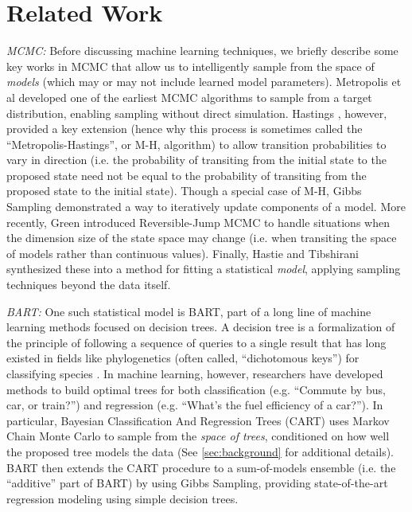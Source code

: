 \documentclass[12pt]{article}
\begin{document}
\section{Related Work}\label{sec:related}

\emph{MCMC:} Before discussing machine learning techniques, we briefly describe some key works in MCMC that allow us to intelligently sample from the space of \emph{models} (which may or may not include learned model parameters).  Metropolis et al \cite{metropolis1953equation} developed one of the earliest MCMC algorithms to sample from a target distribution, enabling sampling without direct simulation.  Hastings \cite{hastings1970monte}, however, provided a key extension (hence why this process is sometimes called the ``Metropolis-Hastings'', or M-H, algorithm) to allow transition probabilities to vary in direction (i.e. the probability of transiting from the initial state to the proposed state need not be equal to the probability of transiting from the proposed state to the initial state).  Though a special case of M-H, Gibbs Sampling \cite{geman1984stochastic} demonstrated a way to iteratively update components of a model.  More recently, Green \cite{green1995reversible} introduced Reversible-Jump MCMC to handle situations when the dimension size of the state space may change (i.e. when transiting the space of models rather than continuous values).  Finally, Hastie and Tibshirani \cite{hastie2000bayesian} synthesized these into a method for fitting a statistical \emph{model}, applying sampling techniques beyond the data itself.

\emph{BART:} One such statistical model is BART, part of a long line of machine learning methods focused on decision trees.   A decision tree is a formalization of the principle of following a sequence of queries to a single result that has long existed in fields like phylogenetics (often called, ``dichotomous keys'') for classifying species \cite{pankhurst1991practical}.  In machine learning, however, researchers have developed methods to build optimal trees for both classification (e.g. ``Commute by bus, car, or train?'') and regression \cite{breiman1984classification} (e.g. ``What's the fuel efficiency of a car?'').  In particular, Bayesian Classification And Regression Trees (CART) \cite{chipman1998bayesian} uses Markov Chain Monte Carlo to sample from the \emph{space of trees}, conditioned on how well the proposed tree models the data (See \autoref{sec:background} for additional details).  BART \cite{chipman2010bart} then extends the CART procedure to a sum-of-models ensemble (i.e. the ``additive'' part of BART) by using Gibbs Sampling, providing state-of-the-art regression modeling using simple decision trees. 
\end{document}

